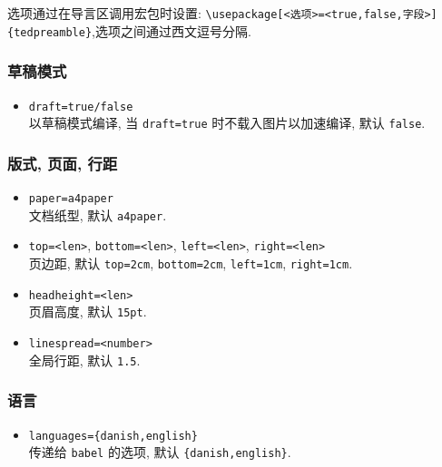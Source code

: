 \documentclass[12pt]{article}
\begin{document}
	选项通过在导言区调用宏包时设置: \lstinline|\usepackage[<选项>=<true,false,字段>]{tedpreamble}|,选项之间通过西文逗号分隔.
	
	\subsubsection{草稿模式}
	\begin{itemize}[itemsep=1ex]
		\item \texttt{draft=true/false}\\
		以草稿模式编译, 当 \texttt{draft=true} 时不载入图片以加速编译, 默认 \texttt{false}.
	\end{itemize}
	
	\subsubsection{版式, 页面, 行距}
	\begin{itemize}[itemsep=1ex]
		\item \texttt{paper=a4paper}\\
		文档纸型, 默认 \texttt{a4paper}.
		
		\item \texttt{top=<len>}, \texttt{bottom=<len>}, \texttt{left=<len>}, \texttt{right=<len>}\\
		页边距, 默认 \texttt{top=2cm}, \texttt{bottom=2cm}, \texttt{left=1cm}, \texttt{right=1cm}.
		
		\item \texttt{headheight=<len>}\\
		页眉高度, 默认 \texttt{15pt}.
		
		\item \texttt{linespread=<number>}\\
		全局行距, 默认 \texttt{1.5}.
	\end{itemize}
	
	\subsubsection{语言}
	\begin{itemize}[itemsep=1ex]
		\item \texttt{languages=\{danish,english\}}\\
		传递给 \texttt{babel} 的选项, 默认 \texttt{\{danish,english\}}.
	\end{itemize}
	
\end{document}
